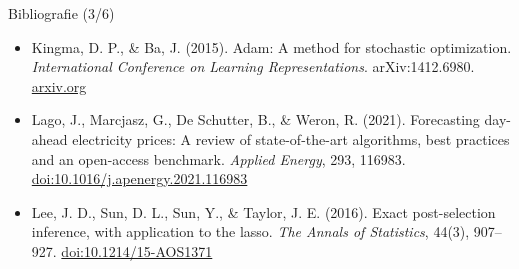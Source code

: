 \begin{frame}{Bibliografie (3/6)}
\begin{itemize}
    \item Kingma, D. P., \& Ba, J. (2015). Adam: A method for stochastic optimization. \textit{International Conference on Learning Representations}. arXiv:1412.6980. \href{https://arxiv.org/abs/1412.6980}{arxiv.org}
    \item Lago, J., Marcjasz, G., De Schutter, B., \& Weron, R. (2021). Forecasting day-ahead electricity prices: A review of state-of-the-art algorithms, best practices and an open-access benchmark. \textit{Applied Energy}, 293, 116983. \href{https://doi.org/10.1016/j.apenergy.2021.116983}{doi:10.1016/j.apenergy.2021.116983}
    \item Lee, J. D., Sun, D. L., Sun, Y., \& Taylor, J. E. (2016). Exact post-selection inference, with application to the lasso. \textit{The Annals of Statistics}, 44(3), 907--927. \href{https://doi.org/10.1214/15-AOS1371}{doi:10.1214/15-AOS1371}
\end{itemize}
\end{frame}


